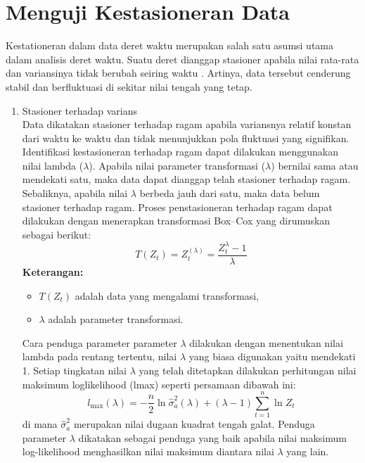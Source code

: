 \section{Menguji Kestasioneran Data}
Kestationeran dalam data deret waktu merupakan salah satu asumsi utama dalam analisis deret waktu. 
Suatu deret dianggap stasioner apabila nilai rata-rata dan variansinya tidak berubah seiring waktu \citep{ilmi2023gstarima}. 
Artinya, data tersebut cenderung stabil dan berfluktuasi di sekitar nilai tengah yang tetap.
\begin{enumerate}[label=\alph*.]
    \item Stasioner terhadap varians \\
        Data dikatakan stasioner terhadap ragam apabila variansnya relatif konstan dari waktu ke waktu dan tidak menunjukkan pola fluktuasi yang signifikan. 
        Identifikasi kestasioneran terhadap ragam dapat dilakukan menggunakan nilai lambda ($\lambda$). 
        Apabila nilai parameter transformasi ($\lambda$) bernilai sama atau mendekati satu, maka data dapat dianggap telah stasioner terhadap ragam. 
        Sebaliknya, apabila nilai $\lambda$ berbeda jauh dari satu, maka data belum stasioner terhadap ragam. 
        Proses penstasioneran terhadap ragam dapat dilakukan dengan menerapkan transformasi Box–Cox yang dirumuskan sebagai berikut:
        \begin{equation}
            T(Z_t) = Z_t^{(\lambda)} = \frac{Z_t^{\lambda} - 1}{\lambda}
        \end{equation}
        \textbf{Keterangan:}
        \begin{itemize}
            \item $T(Z_t)$ adalah data yang mengalami transformasi,
            \item $\lambda$ adalah parameter transformasi.
        \end{itemize}
        Cara penduga parameter parameter $\lambda$ dilakukan dengan menentukan nilai lambda pada rentang tertentu, nilai $\lambda$ yang biasa digunakan yaitu mendekati 1. 
        Setiap tingkatan nilai $\lambda$ yang telah ditetapkan dilakukan perhitungan nilai maksimum loglikelihood (lmax) seperti persamaan dibawah ini:
        \begin{equation}
            l_{\max}(\lambda) = -\frac{n}{2}\ln \hat{\sigma}_a^2(\lambda) + (\lambda - 1)\sum_{t=1}^{n} \ln Z_t
        \end{equation}
        di mana $\hat{\sigma}_a^2$ merupakan nilai dugaan kuadrat tengah galat.
        Penduga parameter $\lambda$ dikatakan sebagai penduga yang baik apabila nilai maksimum log-likelihood menghasilkan nilai maksimum diantara nilai $\lambda$ yang lain.

\end{enumerate}
